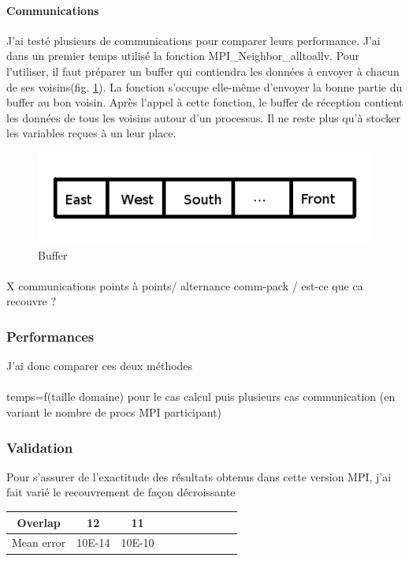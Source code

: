\paragraph{Communications}J'ai testé plusieurs de communications pour comparer leurs performance. J'ai dans un premier temps utilisé la fonction MPI\_Neighbor\_alltoallv. Pour l'utiliser, il faut préparer un buffer qui contiendra les données à envoyer à chacun de ses voisins(fig. \ref{fig:neighbor_buf}). La fonction s'occupe elle-même d'envoyer la bonne partie du buffer au bon voisin. Après l'appel à cette fonction, le buffer de réception contient les données de tous les voisins autour d'un processus. Il ne reste plus qu'à stocker les variables reçues à un leur place.

\begin{figure}[ht]
  \centering
  \includegraphics[scale=0.3]{figures/neighbor.png}
  \caption{\label{fig:neighbor_buf} Buffer}
\end{figure}

\paragraph{}X communications points à points/ alternance comm-pack / est-ce que ca recouvre ? 

\subsubsection{Performances}




J'ai donc comparer ces deux méthodes

\paragraph{}temps=f(taille domaine) pour le cas calcul puis plusieurs cas communication (en variant le nombre de procs MPI participant)


\subsubsection{Validation}
Pour s'assurer de l'exactitude des résultats obtenus dans cette version MPI, j'ai fait varié le recouvrement de façon décroissante


\begin{tabular}{|c|c|c||c|c|c|c||c|c|c|}
  \hline
  Overlap & 12 & 11 \\
  \hline
  Mean error & 10E-14 & 10E-10 \\
  \hline
\end{tabular}
